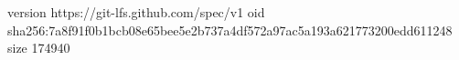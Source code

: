 version https://git-lfs.github.com/spec/v1
oid sha256:7a8f91f0b1bcb08e65bee5e2b737a4df572a97ac5a193a621773200edd611248
size 174940
